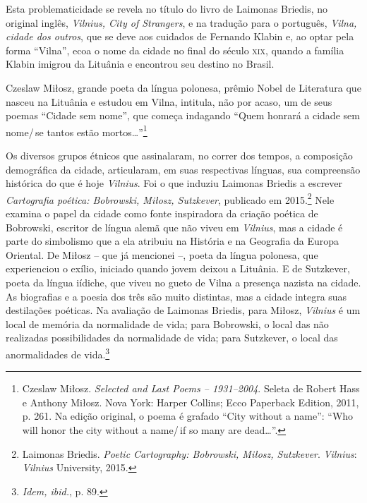 \begin{multicols}{2}
Esta problematicidade se revela no título do livro de Laimonas Briedis,
no original inglês, \textit{Vilnius, City of Strangers}, e na tradução
para o português, \textit{Vilna, cidade dos outros}, que se deve aos
cuidados de Fernando Klabin e, ao optar pela forma ``Vilna'', ecoa o nome
da cidade no final do século \textsc{xix}, quando a família Klabin imigrou da
Lituânia e encontrou seu destino no Brasil.

Czeslaw Miłosz, grande poeta da língua polonesa, prêmio Nobel de
Literatura que nasceu na Lituânia e estudou em Vilna, intitula, não por
acaso, um de seus poemas ``Cidade sem nome'', que começa indagando
``Quem honrará a cidade sem nome/\,se tantos estão mortos\dots{}''\footnote{Czeslaw Miłosz. \textit{Selected and Last Poems --
  1931--2004}. Seleta de Robert Hass e Anthony Miłosz. Nova York: Harper
  Collins; Ecco Paperback Edition, 2011, p. 261. Na edição original, o poema é grafado ``City without a name'': ``Who will honor the city without a name/\,if so many are
dead\ldots{}''.}

Os diversos grupos étnicos que assinalaram, no correr dos tempos, a
composição demográfica da cidade, articularam, em suas respectivas
línguas, sua compreensão histórica do que é hoje \textit{Vilnius}. Foi o que
induziu Laimonas Briedis a escrever \textit{Cartografia poética:
 Bobrowski, Miłosz, Sutzkever}, publicado em 2015.\footnote{Laimonas Briedis.
  \textit{Poetic Cartography: Bobrowski, Miłosz, Sutzkever}. \textit{Vilnius}: \textit{Vilnius} University, 2015.} Nele examina
o papel da cidade como fonte inspiradora da criação poética de Bobrowski, escritor de língua alemã que não viveu em \textit{Vilnius}, mas a cidade é
parte do simbolismo que a ela atribuiu na História e na Geografia da
Europa Oriental. De Miłosz -- que já mencionei --, poeta da língua
polonesa, que experienciou o exílio, iniciado quando jovem deixou a
Lituânia. E de Sutzkever, poeta da língua iídiche, que viveu no gueto de
Vilna a presença nazista na cidade. As biografias e a poesia dos três
são muito distintas, mas a cidade integra suas destilações poéticas. Na
avaliação de Laimonas Briedis, para Miłosz, \textit{Vilnius} é um local de
memória da normalidade de vida; para Bobrowski, o local das não
realizadas possibilidades da normalidade de vida; para Sutzkever, o
local das anormalidades de vida.\footnote{\textit{Idem, ibid.}, p. 89.}

\vspace{\baselineskip}
{\small{}}
\vspace{\baselineskip}


\end{multicols}
